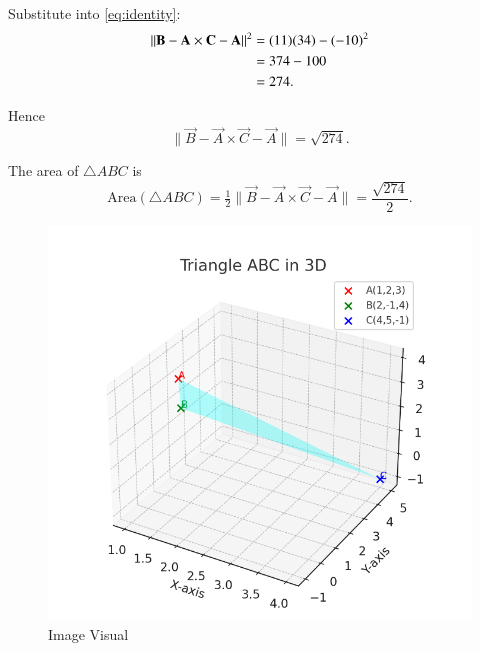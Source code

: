 \documentclass[journal]{IEEEtran}
\begin{document}
Substitute into \eqref{eq:identity}:
\begin{align}
\|\vec{B}-\vec{A} \times \vec{C}-\vec{A}\|^2 &= (11)(34) - (-10)^2 \notag\\
&= 374 - 100 \notag\\
&= 274. \label{eq:crosssq}
\end{align}

 Hence
\begin{equation}
\|\vec{B}-\vec{A}\times \vec{C}-\vec{A}\| = \sqrt{274}. \label{eq:crossnorm}
\end{equation}

 The area of $\triangle ABC$ is
\begin{equation}
\text{Area}(\triangle ABC) 
= \tfrac{1}{2}\|\vec{B}-\vec{A}\times\vec{C}-\vec{A}\|
= \frac{\sqrt{274}}{2}. \label{eq:area}
\end{equation}
\begin{figure}[H]
    \centering
    \includegraphics[width=0.5\linewidth]{figs/image.png}
    \caption{Image Visual}
    \label{fig:figs/image.png}
\end{figure}
\end{document}
